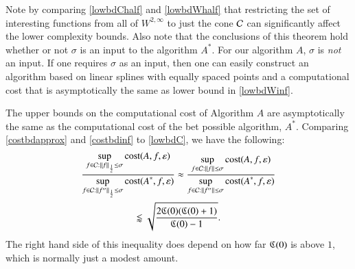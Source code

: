 \documentclass[review]{elsarticle}
\newcommand{\abstol}{\varepsilon}
\theoremstyle{definition}
\renewcommand{\cw}{W}
\begin{document}
Note by comparing \eqref{lowbdChalf} and \eqref{lowbdWhalf} that restricting the
set of interesting functions from all of $ \cw^{2,\infty}$ to just the cone
$\mathcal{C}$ can significantly affect the lower complexity bounds. Also note that the
conclusions of this theorem hold whether or not $\sigma$ is an input to the
algorithm $A^*$. For our algorithm $A$, $\sigma$ is \emph{not} an input. If one
requires $\sigma$ as an input, then one can easily construct an algorithm based
on linear splines with equally spaced points and a computational cost that is
asymptotically the same as lower bound in \eqref{lowbdWinf}.

The upper bounds on the computational cost of Algorithm $A$ are asymptotically
the same as the computational cost of the bet possible algorithm, $A^*$.
Comparing \eqref{costbdapprox} and \eqref{costbdinf} to \eqref{lowbdC}, we have
the following:
\begin{multline*}
\frac{\displaystyle \sup_{f \in \cc : \norm[\frac 12]{f} \le \sigma} \cost(A,f,\abstol)}{\displaystyle	\sup_{f \in \cc : \norm[\frac12]{f''} \le\sigma } \cost(A^*,f,\abstol) } \approx
\frac{\displaystyle \sup_{f \in \cc : \norm{f} \le \sigma} \cost(A,f,\abstol)}{\displaystyle	\sup_{f \in \cc : \norm{f''} \le\sigma } \cost(A^*,f,\abstol) } \\ \lessapprox \sqrt{\frac{2 \fC(0)(\fC(0)+1)}{\fC(0)-1}}.
\end{multline*}
The right hand side of this inequality does depend on how far $\mathfrak{C}(0)$ is above
$1$, which is normally just a modest amount.
\end{document}

